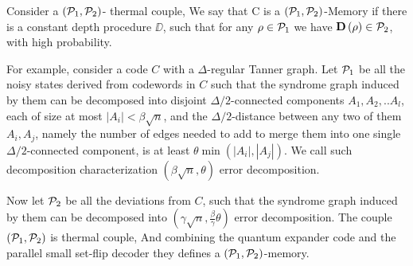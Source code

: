  \begin{definition}[$(\Po,\Pt)$-Memory]
   Consider a $\left(\mathcal{P}_{1},\mathcal{P}_{2} \right)$- thermal couple, We say that C is a $(\Po, \Pt)$-Memory if there is a constant depth procedure $\DD$, such that for any $\rho \in \mathcal{P}_{1}$ we have $\mathbf{D}\left( \rho \right) \in \mathcal{P}_{2}$, with high probability. 
 \end{definition}
 For example, consider a code $C$ with a $\Delta$-regular Tanner graph. Let $\mathcal{P}_{1}$ be all the noisy states derived from codewords in $C$ such that the syndrome graph induced by them can be decomposed into disjoint $\Delta/2$-connected components $A_{1},A_{2},..A_{l}$, each of size at most $|A_{i}| < \beta \sqrt{n}$, and the $\Delta/2$-distance between any two of them $A_{i}, A_{j}$, namely the number of edges needed to add to merge them into one single $\Delta/2$-connected component, is at least $\theta \min \left( |A_{i}|, |A_{j}| \right)$. We call such decomposition characterization $(\beta \sqrt{n}, \theta )$ error decomposition. 

 Now let $\mathcal{P}_{2}$ be all the deviations from $C$, such that the syndrome graph induced by them can be decomposed into $(\gamma \sqrt{n}, \frac{\beta}{\gamma}  \theta )$ error decomposition. The couple $\left( \mathcal{P}_{1}, \mathcal{P}_{2} \right)$ is thermal couple, And combining the quantum expander code and the parallel small set-flip decoder \cite{grospellier:tel-03364419} they defines a $\left( \mathcal{P}_{1}, \mathcal{P}_{2} \right)$-memory. 










  \newcommand{\sliceb}[1]{ \slice[style=blue, label style={inner sep=1pt,anchor=south west,rotate=40}]{#1}}

